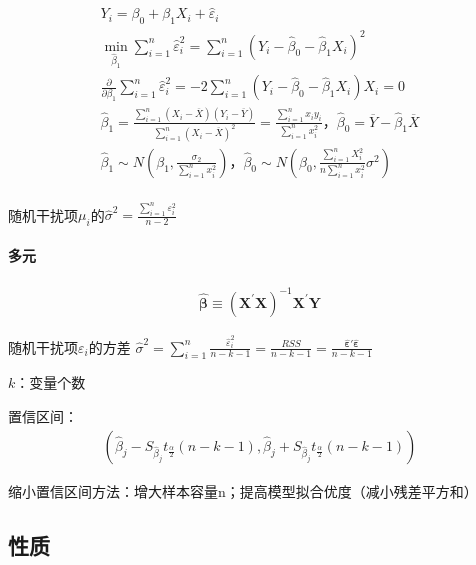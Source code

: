 \documentclass[12pt]{book}
\begin{document}
\begin{gather*}
    Y_i = \beta_0+\beta_{1}X_{i}+{\hat{\varepsilon}}_i\\
    \min_{{\hat{\beta}}_1}{\sum_{i=1}^{n}{\hat{\varepsilon}}_i^2} =\sum_{i=1}^{n}{\left(Y_i-{\hat{\beta}}_0-{\hat{\beta}}_1 X_i\right)^2}\\
    \frac{\partial}{\partial \beta_{1}}  \sum_{i=1}^{n}{\hat{ε}_i^2} =-2\sum_{i=1}^{n}{(Y_i-\hat{\beta}_{0}-\hat{\beta}_{1} X_i) X_{i}}=0\\
    \hat{\beta}_{1} = \frac{\sum_{i=1}^{n}\left(X_i-\overline{X}\right)\left(Y_i-\overline{Y}\right)}{\sum_{i=1}^{n}\left(X_i-\overline{X}\right)^2}=\frac{\sum_{i=1}^{n}{x_i y_i}}{\sum_{i=1}^{n}x_i^2}，\hat{\beta}_{0}=\overline{Y}-\hat{\beta}_{1}\overline{X}\\
    {\hat{\beta}}_1 \sim N\left(\beta_1,\frac{\sigma_2}{\sum_{i=1}^{n}{x_i^2}}\right)，\hat{\beta}_{0} \sim N\left(\beta_0, \frac{\sum_{i=1}^{n}{X_i^2}}{ n \sum_{i=1}^{n}{x_i^2}} \sigma^2\right)\\
\end{gather*}


随机干扰项$\mu_{i}$的$\hat{\sigma}^2 =\frac{\sum_{i=1}^{n}{\varepsilon_i^2}}{n-2}$

\paragraph{多元}

\begin{gather*}
    \hat{\bm{\beta}} \equiv \left(\bm{X}^\prime\bm{X}\right)^{-1}\bm{X}^\prime\bm{Y}
\end{gather*}

随机干扰项$\varepsilon_i$的方差
$\hat{\sigma}^2  = \sum_{i=1}^{n}{ 	\frac{ \hat{\varepsilon}_i^2 }{n-k-1} 	} = \frac{RSS}{n-k-1} = \frac{\bm{\hat{\varepsilon}'\hat{\varepsilon}}}{n-k-1}$

$k$：变量个数

置信区间：
\begin{gather*}
    \left( \hat{\beta}_j-S_{\hat{\beta}_j} t_{\frac{\alpha}{2}}(n-k-1), \hat{\beta}_j+S_{\hat{\beta}_j} t_{\frac{\alpha}{2}}(n-k-1) \right)
\end{gather*}

缩小置信区间方法：增大样本容量n；提高模型拟合优度（减小残差平方和）

\subsection{性质}
\end{document}
